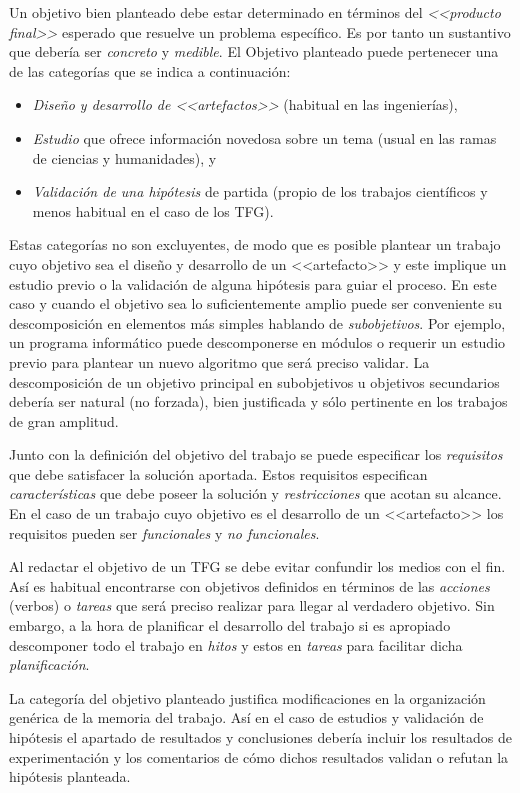 Un objetivo bien planteado debe estar determinado en términos del \emph{<<producto final>>} esperado que resuelve un problema específico. Es por tanto un sustantivo que debería ser \emph{concreto} y \emph{medible}. El \textsf{Objetivo} planteado puede pertenecer una de las categorías que se indica a continuación:
\begin{itemize}
	\item \emph{Diseño y desarrollo de <<artefactos>>} 
	(habitual en las ingenierías),
	\item \emph{Estudio} que ofrece información novedosa sobre un tema (usual en las ramas de ciencias y humanidades), y
	\item \emph{Validación de una 
	hipótesis} de partida (propio de los trabajos 
	científicos y menos habitual en el caso de los TFG).
\end{itemize}

Estas categorías no son excluyentes, de modo que es posible plantear un trabajo cuyo objetivo sea el diseño y desarrollo de un <<artefacto>> y este implique un estudio previo o la validación de alguna hipótesis para guiar el proceso. En este caso y cuando el objetivo sea lo suficientemente amplio puede ser conveniente su descomposición en elementos más simples hablando de \emph{subobjetivos}. Por ejemplo, un programa informático puede descomponerse en módulos o requerir un estudio previo para plantear un nuevo algoritmo que será preciso validar. La descomposición de un objetivo principal en subobjetivos 
u objetivos secundarios debería ser natural (no forzada), bien justificada y 
sólo pertinente en los trabajos de gran amplitud.

Junto con la definición del objetivo del trabajo se puede especificar los \emph{requisitos} que debe satisfacer la solución aportada. Estos requisitos especifican \emph{características} que debe poseer la solución y \emph{restricciones} que acotan su alcance. En el caso de un trabajo cuyo objetivo es el desarrollo de un <<artefacto>> los requisitos pueden ser \emph{funcionales} y \emph{no funcionales}.

Al redactar el objetivo de un TFG se debe evitar confundir los medios con el 
fin. Así es habitual encontrarse con objetivos definidos en términos de las 
\emph{acciones} (verbos) o \emph{tareas} que será preciso 
realizar para llegar al verdadero objetivo. Sin embargo, a la hora de 
planificar el desarrollo del trabajo si es apropiado descomponer todo el 
trabajo en \emph{hitos} y estos en \emph{tareas} para facilitar dicha 
\emph{planificación}.

La categoría del objetivo planteado justifica modificaciones en la organización genérica de la memoria del trabajo. Así en el caso de estudios y validación de hipótesis el apartado de resultados y conclusiones debería incluir los resultados de experimentación y los comentarios de cómo dichos resultados validan o refutan la hipótesis planteada.

